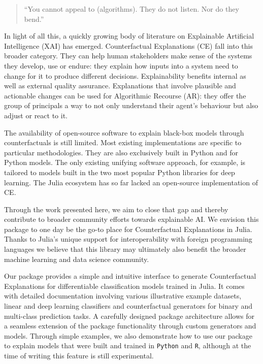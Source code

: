 \documentclass{juliacon}
\begin{document}
\begin{quote}
``You cannot appeal to (algorithms). They do not listen. Nor do they
bend.'' \cite{oneil2016weapons}
\end{quote}

In light of all this, a quickly growing body of literature on
Explainable Artificial Intelligence (XAI) has emerged. Counterfactual
Explanations (CE) fall into this broader category. They can help human
stakeholders make sense of the systems they develop, use or endure: they
explain how inputs into a system need to change for it to produce
different decisions. Explainability benefits internal as well as
external quality assurance. Explanations that involve plausible and
actionable changes can be used for Algorithmic Recourse (AR): they offer
the group of principals a way to not only understand their agent's
behaviour but also adjust or react to it.

The availability of open-source software to explain black-box models
through counterfactuals is still limited. Most existing implementations
are specific to particular methodologies. They are also exclusively
built in Python and for Python models. The only existing unifying
software approach, for example, is tailored to models built in the two
most popular Python libraries for deep learning. The Julia ecosystem has
so far lacked an open-source implementation of CE.

Through the work presented here, we aim to close that gap and thereby
contribute to broader community efforts towards explainable AI. We
envision this package to one day be the go-to place for Counterfactual
Explanations in Julia. Thanks to Julia's unique support for
interoperability with foreign programming languages we believe that this
library may ultimately also benefit the broader machine learning and
data science community.

Our package provides a simple and intuitive interface to generate
Counterfactual Explanations for differentiable classification models
trained in Julia. It comes with detailed documentation involving various
illustrative example datasets, linear and deep learning classifiers and
counterfactual generators for binary and multi-class prediction tasks. A
carefully designed package architecture allows for a seamless extension
of the package functionality through custom generators and models.
Through simple examples, we also demonstrate how to use our package to
explain models that were built and trained in \texttt{Python} and
\texttt{R}, although at the time of writing this feature is still
experimental.
\end{document}
